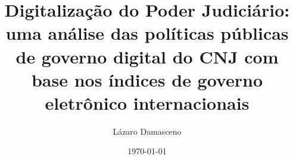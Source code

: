 \documentclass[12pt, a4paper]{report}
\begin{document}
\title{Digitalização do Poder Judiciário: uma análise das políticas públicas de governo digital do CNJ com base nos índices de governo eletrônico internacionais} 

\author{Lázaro Damasceno}
\date{\today}
\maketitle

\listoffigures
\listoftables
\tableofcontents








\end{document}
